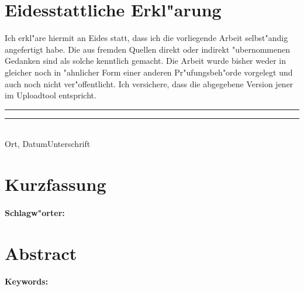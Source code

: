 \documentclass[a4paper,bibtotoc,oneside]{scrbook}
\begin{document}
\newpage


\section*{Eidesstattliche Erkl"arung}\thispagestyle{empty}
\glqq Ich erkl"are hiermit an Eides statt, dass ich die vorliegende Arbeit selbst"andig angefertigt habe. 
Die aus fremden Quellen direkt oder indirekt "ubernommenen Gedanken sind als solche kenntlich gemacht. 
Die Arbeit wurde bisher weder in gleicher noch in "ahnlicher Form einer anderen Pr"ufungsbeh"orde vorgelegt
und auch noch nicht ver"offentlicht. Ich versichere, dass die abgegebene Version jener im Uploadtool entspricht.\grqq\\[5\baselineskip]
\rule{5cm}{0.2pt}\hfill\rule{5cm}{0.2pt}\\
\phantom{Datum }Ort, Datum\hfill Unterschrift\hspace{15mm}

\newpage


\section*{Kurzfassung}\thispagestyle{empty}

\vfill
\paragraph*{Schlagw"orter:} 


\newpage

\section*{Abstract}\thispagestyle{empty}

\vfill
\paragraph*{Keywords:}
\newpage


\tableofcontents\thispagestyle{empty}
\newpage

\setcounter{page}{1}

\end{document}
